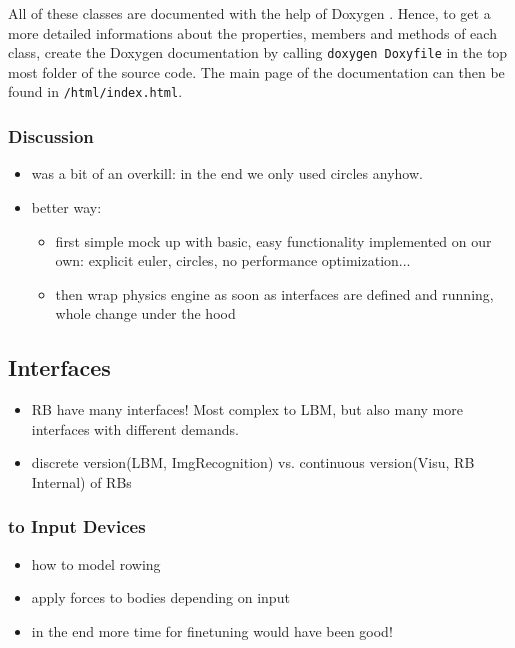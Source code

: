 All of these classes are documented with the help of Doxygen \cite{Doxygen}. Hence, to get a more detailed informations about the properties, members and methods of each class, create the Doxygen documentation by calling \texttt{doxygen Doxyfile} in the top most folder of the source code. The main page of the documentation can then be found in \texttt{/html/index.html}.

\subsubsection{Discussion}
\begin{itemize}
\item was a bit of an overkill: in the end we only used circles anyhow.
\item better way: 
\begin{itemize}
\item first simple mock up with basic, easy functionality implemented on our own: explicit euler, circles, no performance optimization...
\item then wrap physics engine as soon as interfaces are defined and running, whole change under the hood
\end{itemize}
\end{itemize}

\subsection{Interfaces}
\begin{itemize}
\item RB have many interfaces! Most complex to LBM, but also many more interfaces with different demands.
\item discrete version(LBM, ImgRecognition) vs. continuous version(Visu, RB Internal) of RBs
\end{itemize}
\subsubsection{to Input Devices}
\begin{itemize}
\item how to model rowing
\item apply forces to bodies depending on input
\item in the end more time for finetuning would have been good!
\end{itemize}
